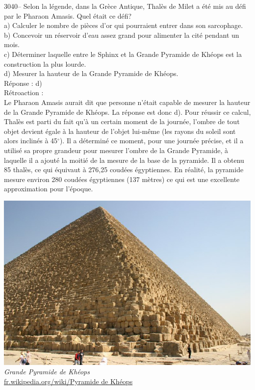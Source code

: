 \documentclass[letterpaper, 12pt]{article}
\begin{document}
3040-- Selon la l\'egende, dans la Gr\`ece Antique, Thal\`es de Milet a \'et\'e mis au d\'efi par le Pharaon Amasis. Quel \'etait ce d\'efi?\\

a) Calculer le nombre de pi\`eces d'or qui pourraient entrer dans son sarcophage.\\
b) Concevoir un r\'eservoir d'eau assez grand pour alimenter la cit\'e pendant un mois.\\
c) D\'eterminer laquelle entre le Sphinx et la Grande Pyramide de Kh\'eops est la construction la plus lourde.\\
d) Mesurer la hauteur de la Grande Pyramide de Kh\'eops.\\

R\'eponse : d)\\

R\'etroaction :\\
Le Pharaon Amasis aurait dit que personne n'\'etait capable de mesurer la hauteur de la Grande Pyramide de Kh\'eops. La r\'eponse est donc d). Pour r\'eussir ce calcul, Thal\`es est parti du fait qu'\`a un certain moment de la journ\'ee, l'ombre de tout objet devient \'egale \`a la hauteur de l'objet lui-m\^eme (les rayons du soleil sont alors inclin\'es \`a 45$^\circ$). Il a d\'etermin\'e ce moment, pour une journ\'ee pr\'ecise, et il a utilis\'e sa propre grandeur pour mesurer l'ombre de la Grande Pyramide, \`a laquelle il a ajout\'e la moiti\'e de la mesure de la base de la pyramide. Il a obtenu 85 thal\`es, ce qui \'equivaut \`a 276,25 coud\'ees \'egyptiennes. En r\'ealit\'e, la pyramide mesure environ 280 coud\'ees \'egyptiennes (137 m\`etres) ce qui est une excellente approximation pour l'\'epoque.
\begin{center}
\includegraphics[scale=0.5]{pyramide.eps}\\
\emph{{\small Grande Pyramide de Kh\'eops}}\\
\href{http://fr.wikipedia.org/wiki/Pyramide de Kh\%C3\%A9ops}{fr.wikipedia.org/wiki/Pyramide de Kh\'eops}\\[5mm]
\end{center}
\end{document}
